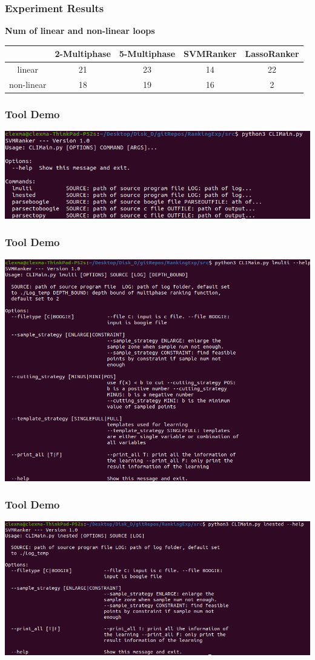 \documentclass[10pt]{beamer}
\begin{document}
\begin{frame}\frametitle{Experiment Results}
\textbf{Num of linear and non-linear loops}
\begin{center}
\begin{tabular}{|c|c|c|c|c|}
\hline
 & 2-Multiphase& 5-Multiphase & SVMRanker & LassoRanker\\

 
\hline
linear &   21 & 23 & 14 & 22\\
\hline 
non-linear &  18& 19 & 16 & 2\\
\hline
\end{tabular}
\end{center}
\end{frame}

\begin{frame}\frametitle{Tool Demo}
\begin{center}
\includegraphics[scale=0.4]{1.png}
\end{center}

\end{frame}

\begin{frame}\frametitle{Tool Demo}
\begin{center}
\includegraphics[scale=0.36]{2.png}
\end{center}

\end{frame}

\begin{frame}\frametitle{Tool Demo}
\begin{center}
\includegraphics[scale=0.34]{3.png}
\end{center}

\end{frame}
\end{document}
